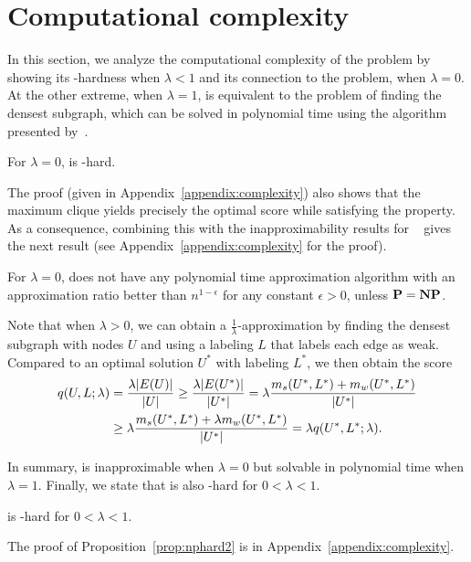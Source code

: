 \section{Computational complexity}\label{sec:compl}
In this section, we analyze the computational complexity of the \prbstrwk problem by showing its \np-hardness when $\lambda < 1$ and its connection to the \prbmaxclique problem, when $\lambda = 0$. 
At the other extreme, when $\lambda = 1$, \prbstrwk is equivalent to the problem of finding the densest subgraph, which can be solved in polynomial time using the algorithm presented by~\citet{goldberg1984finding}.
 
\begin{proposition}
\label{prop:np_hardness}
For $\lambda=0$, \prbstrwk is \np-hard.
\end{proposition}

The proof (given in Appendix~\ref{appendix:complexity}) also shows that the maximum clique 
yields precisely the optimal score 
while satisfying the \stc property. As a consequence, combining this with the inapproximability results for \prbmaxclique~\cite{zuckerman2006linear} gives the next result (see Appendix~\ref{appendix:complexity} for the proof).

\begin{proposition}
\label{prop:inapproximability}
For $\lambda=0$, \prbstrwk does not have any polynomial time approximation algorithm with an approximation ratio better than $n^{1-\epsilon}$ for any constant $\epsilon > 0$, unless $\textbf{P} = \textbf{NP}$.
\end{proposition}

Note that when $\lambda > 0$, we can obtain a $\frac{1}{\lambda}$-approximation by finding the densest subgraph with nodes $U$ and using a labeling $L$ that labels each edge as weak. Compared to an optimal solution $U^*$ with labeling $L^*$, we then obtain the score 
\begin{equation*}
\begin{split}
q(U, L; \lambda) & = \frac{\lambda{\left|E(U)\right|}}{{\left|U\right|}} \geq \frac{\lambda{\left|E(U^*)\right|}}{{\left|U^*\right|}} = \lambda\frac{m_s(U^*, L^*)+m_w(U^*, L^*)}{{\left|U^*\right|}} \\
& \geq \lambda\frac{m_s(U^*, L^*)+\lambda m_w(U^*, L^*)}{{\left|U^*\right|}} = \lambda q(U^*, L^*; \lambda).
\end{split}
\end{equation*}

In summary, \prbstrwk is inapproximable when $\lambda = 0$ but solvable in polynomial time when $\lambda = 1$. Finally, we state that \prbstrwk is also \np-hard for $0 < \lambda < 1$.

\begin{proposition}
\label{prop:nphard2}
\prbstrwk is \np-hard for $0 < \lambda < 1$.
\end{proposition}

The proof of Proposition~\ref{prop:nphard2} is in Appendix~\ref{appendix:complexity}.

